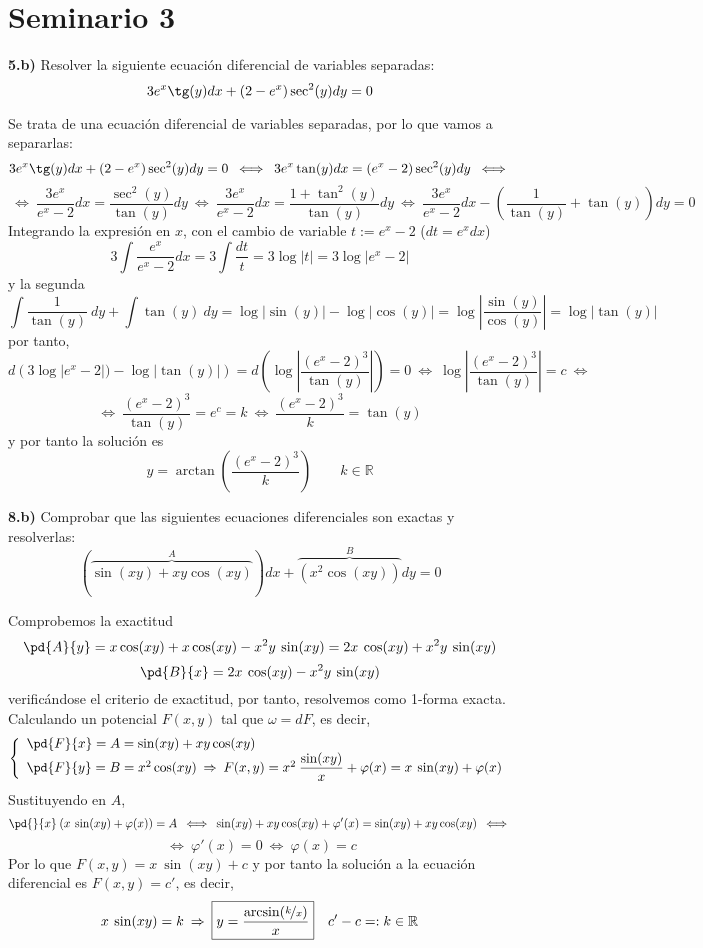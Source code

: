 \section{Seminario 3}
\begin{ejer}
    \textbf{5.b)} Resolver la siguiente ecuación diferencial de variables separadas: 
    $$3e^x \tg(y)dx + (2 - e^x) \sec^2(y)dy = 0$$
\end{ejer}
\begin{sol}
    Se trata de una ecuación diferencial de variables separadas, por lo que vamos a separarlas:
    $$3e^x \tg(y)dx + (2 - e^x) \sec^2(y)dy = 0 \: \iff \: 3e^x \tan(y)dx = (e^x - 2) \sec^2(y)dy \: \iff $$
    $$\: \iff \: \frac{3e^x}{e^x - 2} dx = \dfrac{\sec^2(y)}{\tan(y)}dy \: \iff \: \frac{3e^x}{e^x - 2} dx = \dfrac{1+\tan^2(y)}{\tan(y)}dy \: \iff \: \frac{3e^x}{e^x - 2} dx - \left(\dfrac{1}{\tan(y)}+\tan(y)\right) dy=0$$
    Integrando la expresión en $x$, con el cambio de variable $t:=e^x-2$ ($dt=e^x dx$)
    $$3\int \dfrac{e^x}{e^x-2}dx= 3 \int \dfrac{dt}{t}=3 \log|t|=3\log|e^x-2|$$
    y la segunda
    $$\int \dfrac{1}{\tan(y)}\: dy+\int \tan(y)\:  dy=\log|\sin(y)|-\log|\cos(y)|=\log\left|\dfrac{\sin(y)}{\cos(y)}\right|=\log|\tan(y)|$$
    por tanto,
    $$d\left(3\log|e^x-2|)-\log|\tan(y)|\right)=d\left(\log\left|\dfrac{(e^x-2)^3}{\tan(y)}\right|\right)=0 \: \iff \: \log\left|\dfrac{(e^x-2)^3}{\tan(y)}\right|=c \: \iff \: $$
    $$\iff \: \dfrac{(e^x-2)^3}{\tan(y)}=e^c=k \: \iff  \: \dfrac{(e^x-2)^3}{k}=\tan(y)$$
    y por tanto la solución es 
    $$\boxed{y=\arctan\left(\dfrac{(e^x-2)^3}{k}\right)} \qquad k \in \mathbb R$$
\end{sol}
\begin{ejer}
    \textbf{8.b)} Comprobar que las siguientes ecuaciones diferenciales son exactas y resolverlas:
    $$(\overbrace{\sin(xy) + xy \cos(xy)}^{A})dx + \overbrace{(x^2 \cos(xy))}^Bdy = 0$$
\end{ejer} 
\begin{sol} Comprobemos la exactitud
    $$\pd{A}{y}= x \cos(xy) + x \cos(xy) - x^2y \: \sin(xy)=2x \: \cos(xy)+x^2y\: \sin(xy)$$
    $$\pd{B}{x}=2x \: \cos(xy)-x^2y\: \sin(xy)$$
    verificándose el criterio de exactitud, por tanto, resolvemos como 1-forma exacta. Calculando un potencial $F(x,y)$ tal que $\omega =dF$, es decir,
    $$\left\{ \begin{array}{l}
         \pd{F}{x}=A=\sin(xy) + xy \cos(xy) \\
         \pd{F}{y}=B=x^2 \cos(xy) \: \Rightarrow \: F(x,y)=x^2\: \dfrac{\sin(xy)}{x}+\varphi(x)=x \:  \sin(xy)+\varphi(x)
    \end{array}\right.$$
    Sustituyendo en $A$, 
    $$\pd{}{x} \: (x \:  \sin(xy)+\varphi(x))=A \: \iff \: \sin(xy)+xy\cos(xy)+\varphi'(x)=\sin(xy) + xy \cos(xy) \: \iff $$ $$ \: \iff \: \varphi'(x)=0 \: \iff \: \varphi(x)=c$$
    Por lo que $F(x,y)=x \:  \sin(xy)+c$ y por tanto la solución a la ecuación diferencial es $F(x,y)=c'$, es decir, 
    $$x \:  \sin(xy)=k \: \Rightarrow \: \boxed{y=\dfrac{\arcsin({\nicefrac{k}{x}})}{x}} \quad c'-c=:k \in \mathbb R$$
\end{sol}
